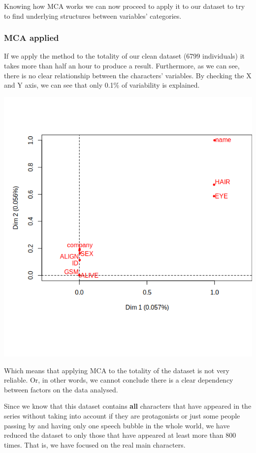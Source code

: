 Knowing how MCA works we can now proceed to apply it to our dataset to try to find underlying structures between variables' categories.


\subsubsection{MCA applied}
If we apply the method to the totality of our clean dataset (6799 individuals) it takes more than half an hour to produce a result. Furthermore, as we can see, there is no clear relationship between the characters' variables. By checking the X and Y axis, we can see that only 0.1\% of variability is explained.


\begin{center}
   \includegraphics[scale=0.5]{img/MCA_01.png}
\end{center}

Which means that applying MCA to the totality of the dataset is not very reliable. Or, in other words, we cannot conclude there is a clear dependency between factors on the data analysed.

Since we know that this dataset contains \textbf{all} characters that have appeared in the series without taking into account if they are protagonists or just some people passing by and having only one speech bubble in the whole world, we have reduced the dataset to only those that have appeared at least more than 800 times. That is, we have focused on the real main characters.

